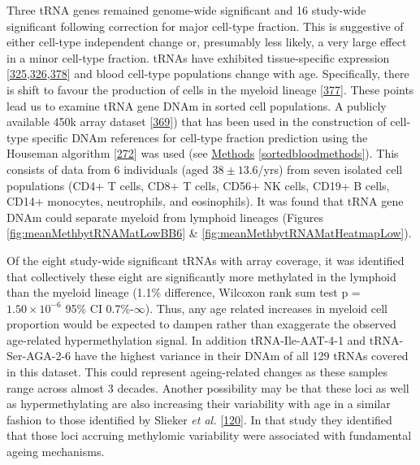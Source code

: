 \documentclass[
]{book}
\begin{document}
Three tRNA genes remained genome-wide significant and 16 study-wide significant following correction for major cell-type fraction.
This is suggestive of either cell-type independent change or, presumably less likely, a very large effect in a minor cell-type fraction.
tRNAs have exhibited tissue-specific expression {[}\protect\hyperlink{ref-Dittmar2006}{325},\protect\hyperlink{ref-Sagi2016}{326},\protect\hyperlink{ref-Schmitt2014b}{378}{]} and blood cell-type populations change with age.
Specifically, there is shift to favour the production of cells in the myeloid lineage {[}\protect\hyperlink{ref-Geiger2013}{377}{]}.
These points lead us to examine tRNA gene DNAm in sorted cell populations.
A publicly available 450k array dataset {[}\protect\hyperlink{ref-Reinius2012}{369}{]}) that has been used in the construction of cell-type specific DNAm references for cell-type fraction prediction using the Houseman algorithm {[}\protect\hyperlink{ref-Houseman2012}{272}{]} was used (see \protect\hyperlink{sortedbloodmethods}{Methods} \ref{sortedbloodmethods}).
This consists of data from 6 individuals (aged \(38 \pm 13.6\)/yrs) from seven isolated cell populations (CD4+ T cells, CD8+ T cells, CD56+ NK cells, CD19+ B cells, CD14+ monocytes, neutrophils, and eosinophils).
It was found that tRNA gene DNAm could separate myeloid from lymphoid lineages (Figures \ref{fig:meanMethbytRNAMatLowBB6} \& \ref{fig:meanMethbytRNAMatHeatmapLow}).

Of the eight study-wide significant tRNAs with array coverage, it was identified that collectively these eight are significantly more methylated in the lymphoid than the myeloid lineage (1.1\% difference, Wilcoxon rank sum test p = \(1.50\times10^{-6}\) 95\% CI 0.7\%-\(\infty\)).
Thus, any age related increases in myeloid cell proportion would be expected to dampen rather than exaggerate the observed age-related hypermethylation signal.
In addition tRNA-Ile-AAT-4-1 and tRNA-Ser-AGA-2-6 have the highest variance in their DNAm of all 129 tRNAs covered in this dataset.
This could represent ageing-related changes as these samples range across almost 3 decades.
Another possibility may be that these loci as well as hypermethylating are also increasing their variability with age in a similar fashion to those identified by Slieker \emph{et al.} {[}\protect\hyperlink{ref-Slieker2016}{120}{]}.
In that study they identified that those loci accruing methylomic variability were associated with fundamental ageing mechanisms.
\end{document}
